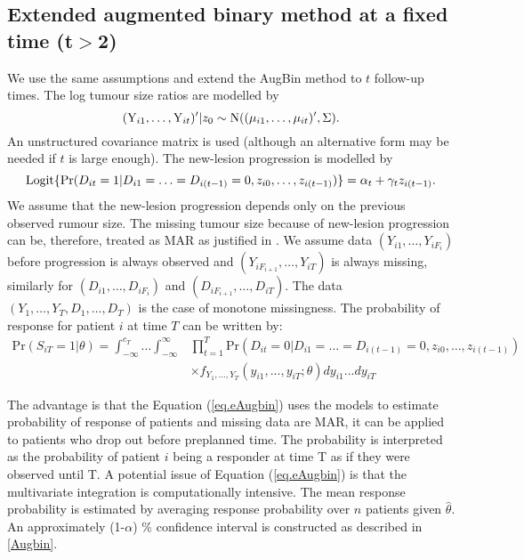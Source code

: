 \documentclass[10pt,A4]{article}
\begin{document}
\subsection{Extended augmented binary method at a fixed time (t$>$2)} \label{modifyAug}
We use the same assumptions and extend the AugBin method to $t$ follow-up times. The log tumour size ratios are modelled by
\begin{equation}
(\text{Y}_{i1}, \dots, \text{Y}_{it})'|z_0 \sim \hbox{N}((\mu_{i1}, \ldots, \mu_{it})',\Sigma).
\end{equation}
An unstructured covariance matrix is used (although an alternative form may be needed if $t$ is large enough). The new-lesion progression is modelled by
\begin{equation}
\hbox{Logit}\{\text{Pr}(D_{it}=1|D_{i1}=\ldots=D_{i(t-1)}=0 , z_{i0},\ldots,z_{i(t-1)})\}=\alpha_t+\gamma_tz_{i(t-1)}.
\end{equation}
We assume that the new-lesion progression depends only on the previous observed rumour size. The missing tumour size because of new-lesion progression can be, therefore, treated as MAR as justified in \cite{Wason2013}. We assume data $(Y_{i1},\ldots,Y_{iF_i})$ before progression is always observed and $(Y_{iF_{i+1}},\dots,Y_{iT})$ is always missing, similarly for $(D_{i1},\ldots,D_{iF_i})$ and $(D_{iF_{i+1}},\dots,D_{iT})$. The data $(Y_1,\dots,Y_T, D_1,\dots,D_T)$ is the case of monotone missingness. The probability of response for patient $i$ at time $T$ can be written by:
\begin{equation}
\begin{array}{cl}
\text{Pr}(S_{iT}=1|\theta)=\int_{-\infty}^{c_T}\ldots \int_{-\infty}^{\infty} &\prod\limits_{t=1}^{T}\text{Pr}(D_{it}=0|D_{i1}=\ldots=D_{i(t-1)}=0 , z_{i0},\ldots,z_{i(t-1)})\\
 & \times f_{Y_1,...,Y_T}(y_{i1},...,y_{iT};\theta)dy_{i1}...dy_{iT}
  \end{array}
  \label{eq.eAugbin}
\end{equation}

The advantage is that the Equation (\ref{eq.eAugbin}) uses the models to estimate probability of response of patients and missing data are MAR, it can be applied to patients who drop out before preplanned time. The probability is interpreted as the probability of patient $i$ being a responder at time T as if they were observed until T. A potential issue of Equation (\ref{eq.eAugbin}) is that the multivariate integration is computationally intensive. The mean response probability is estimated by averaging response probability over $n$ patients given $\hat{\theta}$. An approximately (1-$\alpha$) \% confidence interval is constructed as described in \ref{Augbin}.
\end{document}
